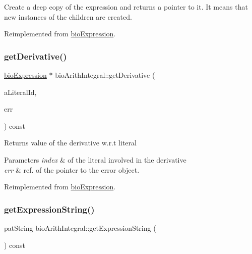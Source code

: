 Create a deep copy of the expression and returns a pointer to it. It means that new instances of the children are created. 

Reimplemented from \hyperlink{classbio_expression_a4ee1b8add634078a02eaae26cd40dcc8}{bio\+Expression}.

\mbox{\label{classbio_arith_integral_aafdf4edef91568b929fc3e9cd199b202}} 
\subsubsection{\texorpdfstring{get\+Derivative()}{getDerivative()}}
{\footnotesize\ttfamily \hyperlink{classbio_expression}{bio\+Expression} $\ast$ bio\+Arith\+Integral\+::get\+Derivative (\begin{DoxyParamCaption}\item[{pat\+U\+Long}]{a\+Literal\+Id,  }\item[{pat\+Error $\ast$\&}]{err }\end{DoxyParamCaption}) const\hspace{0.3cm}{\ttfamily [virtual]}}

\begin{DoxyReturn}{Returns}
value of the derivative w.\+r.\+t literal 
\end{DoxyReturn}

\begin{DoxyParams}{Parameters}
{\em index} & of the literal involved in the derivative \\
\hline
{\em err} & ref. of the pointer to the error object. \\
\hline
\end{DoxyParams}


Reimplemented from \hyperlink{classbio_expression_a5915579d1193f25f216c1e273c97f2ce}{bio\+Expression}.

\mbox{\label{classbio_arith_integral_a597593196620aa13462aebf9166f1678}} 
\subsubsection{\texorpdfstring{get\+Expression\+String()}{getExpressionString()}}
{\footnotesize\ttfamily pat\+String bio\+Arith\+Integral\+::get\+Expression\+String (\begin{DoxyParamCaption}{ }\end{DoxyParamCaption}) const\hspace{0.3cm}{\ttfamily [virtual]}}

